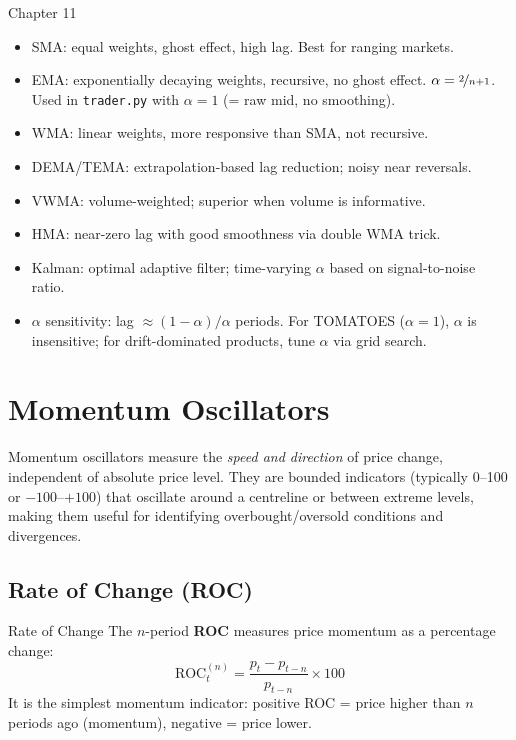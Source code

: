 \documentclass[12pt,a4paper,openany]{report}
\theoremstyle{definition}
\begin{document}
\begin{takeawaybox}{Chapter 11}
\begin{itemize}
  \item SMA: equal weights, ghost effect, high lag. Best for ranging markets.
  \item EMA: exponentially decaying weights, recursive, no ghost effect. $\alpha = \nicefrac{2}{n+1}$. Used in \texttt{trader.py} with $\alpha=1$ (= raw mid, no smoothing).
  \item WMA: linear weights, more responsive than SMA, not recursive.
  \item DEMA/TEMA: extrapolation-based lag reduction; noisy near reversals.
  \item VWMA: volume-weighted; superior when volume is informative.
  \item HMA: near-zero lag with good smoothness via double WMA trick.
  \item Kalman: optimal adaptive filter; time-varying $\alpha$ based on signal-to-noise ratio.
  \item $\alpha$ sensitivity: lag $\approx (1-\alpha)/\alpha$ periods. For TOMATOES ($\alpha=1$), $\alpha$ is insensitive; for drift-dominated products, tune $\alpha$ via grid search.
\end{itemize}
\end{takeawaybox}


\chapter{Momentum Oscillators}

Momentum oscillators measure the \emph{speed and direction} of price change, independent of absolute price level. They are bounded indicators (typically 0--100 or $-100$--$+100$) that oscillate around a centreline or between extreme levels, making them useful for identifying overbought/oversold conditions and divergences.

\section{Rate of Change (ROC)}

\begin{definitionbox}{Rate of Change}
The $n$-period \textbf{ROC} measures price momentum as a percentage change:
\[
  \text{ROC}_t^{(n)} = \frac{p_t - p_{t-n}}{p_{t-n}} \times 100
\]
It is the simplest momentum indicator: positive ROC = price higher than $n$ periods ago (momentum), negative = price lower.
\end{definitionbox}
\end{document}
